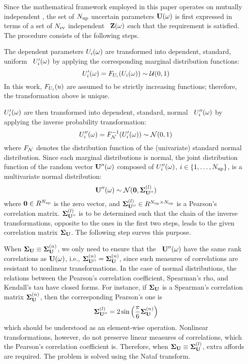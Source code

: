 Since the mathematical framework employed in this paper operates on mutually independent \rvs, the set of ${N_\text{up}}$ uncertain parameters $\mathbf{U}(\omega)$ is first expressed in terms of a set of ${N_\text{rv}}$ independent \rvs\ $\mathbf{Z}(\omega)$ such that the requirement is satisfied. The procedure consists of the following steps.

 The dependent parameters $U_i(\omega)$ are transformed into dependent, standard, uniform \rvs\ $U'_i(\omega)$ by applying the corresponding marginal distribution functions:
\begin{equation} \elabel{dependent-uniform}
  \U'_i(\o) = \CDF_{\U_i}(\U_i(\o)) \sim \uniform(0, 1)
\end{equation}
In this work, $F_{U_i}(u)$ are assumed to be strictly increasing functions; therefore, the transformation above is unique.

 $U'_i(\omega)$ are then transformed into dependent, standard, normal \rvs\ $U''_i(\omega)$ by applying the inverse probability transformation:
\begin{equation} \elabel{dependent-normal}
  \U''_i(\o) = \CDF^{-1}_\normal(\U'_i(\o)) \sim \normal(0, 1)
\end{equation}
where $F_{\mathcal{N}}$ denotes the distribution function of the (univariate) standard normal distribution. Since each marginal distributions is normal, the joint distribution function of the random vector $\mathbf{U}''(\omega)$ composed of $U''_i(\omega)$, $i \in \{ 1, \dots, {N_\text{up}} \}$, is a multivariate normal distribution:
\[
  \mathbf{U}''(\omega) \sim \mathcal{N}(\mathbf{0}, \mathbf{\Sigma}^{(l)}_{\mathbf{U}''})
\]
where $\mathbf{0} \in R^{N_\text{up}}$ is the zero vector, and $\mathbf{\Sigma}^{(l)}_{\mathbf{U}''} \in R^{{N_\text{up}} \times {N_\text{up}}}$ is a Pearson's correlation matrix. $\mathbf{\Sigma}^{(l)}_{\mathbf{U}''}$ is to be determined such that the chain of the inverse transformations, opposite to the ones in the first two steps, leads to the given correlation matrix $\mathbf{\Sigma}_{\mathbf{U}}$. The following step surves this purpose.

 When $\mathbf{\Sigma}_{\mathbf{U}} \equiv \mathbf{\Sigma}^{(n)}_{\mathbf{U}}$, we only need to ensure that the \rvs\ $\mathbf{U}''(\omega)$ have the same rank correlations as $\mathbf{U}(\omega)$, i.e., $\mathbf{\Sigma}^{(n)}_{\mathbf{U}''} = \mathbf{\Sigma}^{(n)}_{\mathbf{U}}$, since such measures of correlations are resistant to nonlinear transformations. In the case of normal distributions, the relations between the Pearson's correlation coefficient, Spearman's rho, and Kendall's tau have closed forms. For instance, if $\mathbf{\Sigma}_{\mathbf{U}}$ is a Spearman's correlation matrix $\mathbf{\Sigma}^{(n)}_{\mathbf{U}}$, then the corresponding Pearson's one is
\[
  \mathbf{\Sigma}^{(l)}_{\mathbf{U}''} = 2 \sin \left( \frac{\pi}{6} \mathbf{\Sigma}^{(n)}_{\mathbf{U}} \right)
\]
which should be understood as an element-wise operation. Nonlinear transformations, however, do not preserve linear measures of correlations, which the Pearson's correlation coefficient is. Therefore, when $\mathbf{\Sigma}_{\mathbf{U}} \equiv \mathbf{\Sigma}^{(l)}_{\mathbf{U}}$, extra affords are required. The problem is solved using the Nataf transform.

